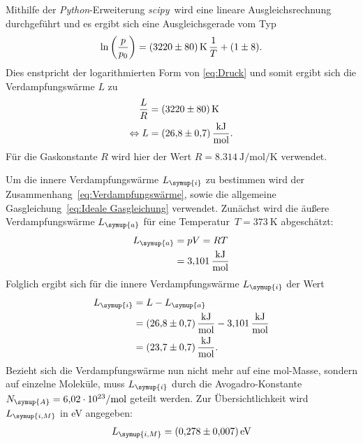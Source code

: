 Mithilfe der 
\textit{Python}-Erweiterung \textit{scipy}\,\cite{scipy} wird eine lineare Ausgleichsrechnung durchgeführt und es ergibt sich eine
Ausgleichsgerade vom Typ
\begin{equation*}
  \ln\left(\frac{p}{p_0}\right)= \qty{3220+-80}{\kelvin} \, \frac{1}{T} + (\num{1+-8}).
\end{equation*}
Dies enstpricht der logarithmierten Form von \eqref{eq:Druck} und somit ergibt sich die Verdampfungswärme $L$ zu
\begin{align*}
  \frac{L}{R} &= \qty{3220+-80}{\kelvin} \\
  \Leftrightarrow L &= \qty{26,8+-0,7}{\kilo\joule\per\mol}.
\end{align*}
Für die Gaskonstante $R$ wird hier der Wert $R = \qty{8,314}{\joule\per\mol\per\kelvin}$ \cite{czichos} verwendet.

Um die innere Verdampfungswärme $L_{\symup{i}}$ zu bestimmen wird der Zusammenhang~\eqref{eq:Verdampfungswärme}, sowie die allgemeine 
Gasgleichung~\eqref{eq:Ideale Gasgleichung} verwendet. Zunächst wird die äußere Verdampfungswärme $L_{\symup{a}}$ für eine 
Temperatur~$T = \qty{373}{\kelvin}$ abgeschätzt:
\begin{align*}
  L_{\symup{a}} &= pV = RT \\
                &= \qty{3,101}{\kilo\joule\per\mol}
\end{align*}
Folglich ergibt sich für die innere Verdampfungswärme $L_{\symup{i}}$ der Wert
\begin{align*}
  L_{\symup{i}} &= L - L_{\symup{a}} \\
                &= \qty{26,8+-0,7}{\kilo\joule\per\mol} - \qty{3,101}{\kilo\joule\per\mol} \\
                &= \qty{23,7+-0,7}{\kilo\joule\per\mol}.
\end{align*}
Bezieht sich die Verdampfungswärme nun nicht mehr auf eine mol-Masse, sondern auf einzelne Moleküle, muss $L_{\symup{i}}$ durch die
Avogadro-Konstante $N_{\symup{A}}=\qty{6,02e23}{\per\mol}$ \cite{czichos} geteilt werden. Zur Übersichtlichkeit wird $L_{\symup{i, M}}$ in eV angegeben:
\begin{align*}
  L_{\symup{i, M}} = \qty{0.278+-0.007}{\electronvolt}
\end{align*}

